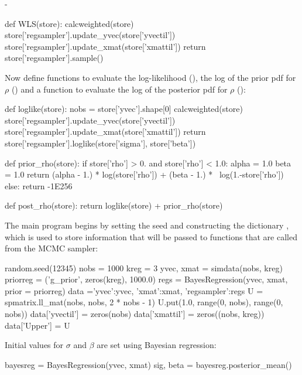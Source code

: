 -\documentclass[article]{jss}
\begin{document}
\begin{Code}
def WLS(store):
    calcweighted(store)
    store['regsampler'].update_yvec(store['yvectil'])
    store['regsampler'].update_xmat(store['xmattil'])
    return store['regsampler'].sample()
\end{Code}

Now define functions to evaluate the log-likelihood (),
the log of the prior pdf for $\rho$ () and a function to evaluate the log of the posterior pdf for $\rho$ ():

\begin{Code}
def loglike(store):
    nobs = store['yvec'].shape[0]
    calcweighted(store)
    store['regsampler'].update_yvec(store['yvectil'])
    store['regsampler'].update_xmat(store['xmattil'])
    return store['regsampler'].loglike(store['sigma'], store['beta'])

def prior_rho(store):
    if store['rho'] > 0. and store['rho'] < 1.0:
        alpha = 1.0
        beta = 1.0
        return (alpha - 1.) * log(store['rho']) + (beta - 1.) * \
          log(1.-store['rho'])
    else:
        return -1E256

def post_rho(store):
    return loglike(store) + prior_rho(store)
\end{Code}




The main program begins by setting the seed and constructing the
\proglang{Python} dictionary \code{data}, which is used to store
information that will be passed to functions that are called from the
MCMC sampler:

\begin{Code}
random.seed(12345)
nobs = 1000
kreg = 3
yvec, xmat = simdata(nobs, kreg)
priorreg = ('g_prior', zeros(kreg), 1000.0)
regs = BayesRegression(yvec, xmat, prior = priorreg)
data ={'yvec':yvec, 'xmat':xmat, 'regsampler':regs}
U = spmatrix.ll_mat(nobs, nobs, 2 * nobs - 1)
U.put(1.0, range(0, nobs), range(0, nobs))
data['yvectil'] = zeros(nobs)
data['xmattil'] = zeros((nobs, kreg))
data['Upper'] = U
\end{Code}

Initial values for $\sigma$ and $\beta$ are set using Bayesian regression:
\begin{Code}
bayesreg = BayesRegression(yvec, xmat)
sig, beta = bayesreg.posterior_mean()
\end{Code}
\end{document}

